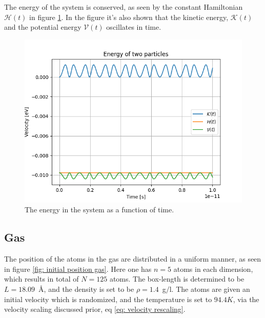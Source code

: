 \documentclass[a4paper]{article}
\begin{document}
The energy of the system is conserved, as seen by the constant Hamiltonian $\mathcal{H}(t)$ in figure \ref{fig: Energy Bouncing test}.
In the figure it's also shown that the kinetic energy, $\mathcal{K}(t)$ and the potential energy $\mathcal{V}(t)$ oscillates in time.
\begin{figure}[H]
    \centering
    \includegraphics[scale = 0.5]{bsE.png}
    \caption{The energy in the system as a function of time.}
    \label{fig: Energy Bouncing test}
\end{figure}

\subsection{Gas}
The position of the atoms in the gas are distributed in a uniform manner, as seen in figure \ref{fig: initial position gas}. Here one has $n = 5$ atoms in each dimension, which results in total of $N = 125$ atoms. 
The box-length is determined to be $L = 18.09$~Å, and the density is set to be $\rho = 1.4$~g$/$l.
The atoms are given an initial velocity which is randomized, and the temperature is set to $94.4K$, via the velocity scaling discussed prior, eq \eqref{eq: velocity rescaling}.
\end{document}
